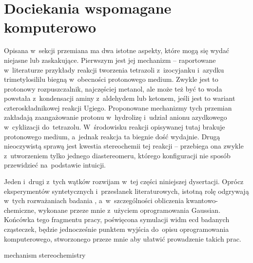 \chapter{Dociekania wspomagane komputerowo}\label{chapter:numeric}

Opisana w~sekcji \textit{} przemiana ma dwa istotne aspekty,
  które mogą się wydać niejasne lub zaskakujące.
Pierwszym jest jej mechanizm \--- raportowane w~literaturze przykłady reakcji tworzenia tetrazoli
  z~izocyjanku i~azydku trimetylosililu biegną w~obecności protonowego medium.
Zwykle jest to protonowy rozpuszczalnik, najczęściej metanol, ale może też być to woda
  powstała z~kondensacji aminy z~aldehydem lub ketonem, jeśli jest to wariant
  czteroskładnikowej reakcji Ugiego.
Proponowane mechanizmy tych przemian zakładają zaangażowanie protonu w~hydrolizę 
  i~udział anionu azydkowego w~cyklizacji do~tetrazolu.
W~środowisku reakcji opisywanej tutaj brakuje protonowego medium, a~jednak reakcja
  ta biegnie dość wydajnie.
Drugą nieoczywistą sprawą jest kwestia stereochemii tej reakcji \--- przebiega ona zwykle
  z~utworzeniem tylko jednego diastereomeru, którego konfiguracji nie sposób przewidzieć
  na~podstawie intuicji.

Jeden i~drugi z~tych wątków rozwijam w~tej części niniejszej dysertacji.
Oprócz eksperymentów syntetycznych i~przesłanek literaturowych, istotną rolę odgrywają w~tych
  rozważaniach badania , a~w~szczególności obliczenia kwantowo-chemiczne,
  wykonane przeze mnie z~użyciem oprogramowania Gaussian.
Końcówka tego fragmentu pracy, poświęcona symulacji widm \gls{ecd} badanych
  cząsteczek, będzie jednocześnie punktem wyjścia do~opisu oprogramowania komputerowego,
  stworzonego przeze mnie aby ułatwić prowadzenie takich prac.

{mechanism}
{stereochemistry}

